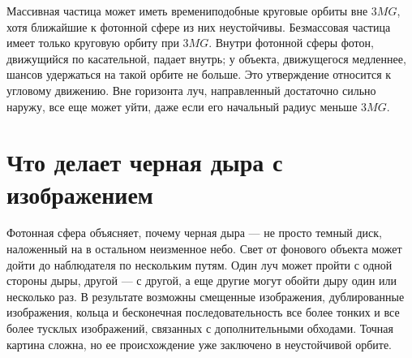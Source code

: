\begin{classroomqa}
\end{classroomqa}

\begin{classroomqa}
\end{classroomqa}

Массивная частица может иметь времениподобные круговые орбиты вне \(3MG\), хотя ближайшие к фотонной сфере из них неустойчивы. Безмассовая частица имеет только круговую орбиту при \(3MG\). Внутри фотонной сферы фотон, движущийся по касательной, падает внутрь; у объекта, движущегося медленнее, шансов удержаться на такой орбите не больше. Это утверждение относится к угловому движению. Вне горизонта луч, направленный достаточно сильно наружу, все еще может уйти, даже если его начальный радиус меньше \(3MG\).

\section{Что делает черная дыра с изображением}

Фотонная сфера объясняет, почему черная дыра — не просто темный диск, наложенный на в остальном неизменное небо. Свет от фонового объекта может дойти до наблюдателя по нескольким путям. Один луч может пройти с одной стороны дыры, другой — с другой, а еще другие могут обойти дыру один или несколько раз. В результате возможны смещенные изображения, дублированные изображения, кольца и бесконечная последовательность все более тонких и все более тусклых изображений, связанных с дополнительными обходами. Точная картина сложна, но ее происхождение уже заключено в неустойчивой орбите.

